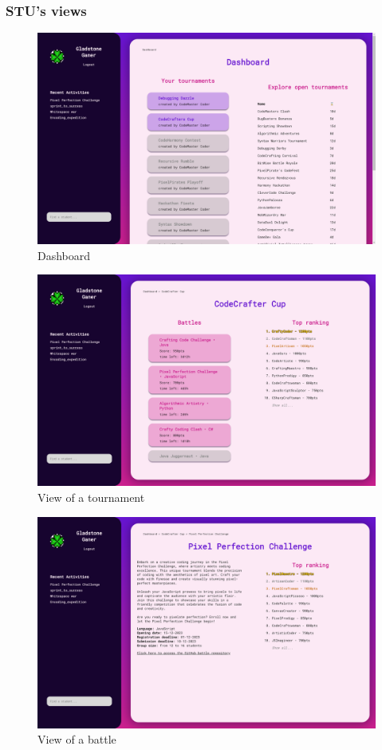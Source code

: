 \subsubsection*{STU's views}
\begin{figure}[H]
    \centering
    \includegraphics[width=.9\textwidth]{images/user_interfaces/student_dashboard.png}
    \caption{Dashboard}
\end{figure}
\begin{figure}[H]
    \centering
    \includegraphics[width=.9\textwidth]{images/user_interfaces/student_tournament_view.png}
    \caption{View of a tournament}
\end{figure}
\begin{figure}[H]
    \centering
    \includegraphics[width=.9\textwidth]{images/user_interfaces/student_battle_view.png}
    \caption{View of a battle}
\end{figure}

